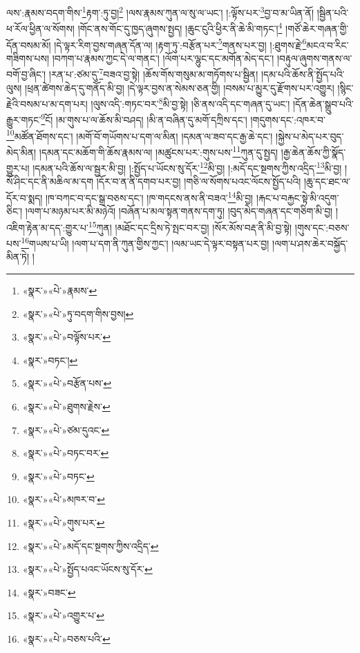 ལས་:རྣམས་བདག་གིས་\footnote{«སྣར་»«པེ་»རྣམས་}རྟག་:ཏུ་བྱ།\footnote{«སྣར་»«པེ་»ཏུ་བདག་གིས་བྱས།} །ལས་རྣམས་ཀུན་ལ་སུ་ལ་ཡང་། །:ལྟོས་པར་\footnote{«སྣར་»«པེ་»བལྟོས་པར་}བྱ་བ་མ་ཡིན་ནོ། །སྦྱིན་པའི་ཕ་རོལ་ཕྱིན་ལ་སོགས། །གོང་ནས་གོང་དུ་ཁྱད་ཞུགས་སྤྱད། །ཆུང་ངུའི་ཕྱིར་ནི་ཆེ་མི་གཏང་།\footnote{«སྣར་»བཏང་།} །གཙོ་ཆེར་གཞན་གྱི་དོན་བསམ་མོ། །དེ་ལྟར་རིག་བྱས་གཞན་དོན་ལ། །རྟག་ཏུ་:བརྩོན་པར་\footnote{«སྣར་»«པེ་»བརྩོན་པས་}གནས་པར་བྱ། །:ཐུགས་རྗེ་\footnote{«སྣར་»«པེ་»ཐུགས་རྗེས་}མངའ་བ་རིང་གཟིགས་པས། །བཀག་པ་རྣམས་ཀྱང་དེ་ལ་གནང་། །ལོག་པར་ལྷུང་དང་མགོན་མེད་དང་། །བརྟུལ་ཞུགས་གནས་ལ་བགོ་བྱ་ཞིང་། །རན་པ་:ཙམ་དུ་\footnote{«སྣར་»«པེ་»ཙམ་དུའང་}བཟའ་བྱ་སྟེ། །ཆོས་གོས་གསུམ་མ་གཏོགས་པ་སྦྱིན། །དམ་པའི་ཆོས་ནི་སྤྱོད་པའི་ལུས། །ཕྲན་ཚེགས་ཆེད་དུ་གནོད་མི་བྱ། །དེ་ལྟར་བྱས་ན་སེམས་ཅན་གྱི། །བསམ་པ་མྱུར་དུ་རྫོགས་པར་འགྱུར། །སྙིང་རྗེའི་བསམ་པ་མ་དག་པར། །ལུས་འདི་:གཏང་བར་\footnote{«སྣར་»«པེ་»བཏང་བར་}མི་བྱ་སྟེ། །ཅི་ནས་འདི་དང་གཞན་དུ་ཡང་། །དོན་ཆེན་སྒྲུབ་པའི་རྒྱུར་གཏང་\footnote{«སྣར་»«པེ་»བཏང་}ངོ། །མ་གུས་པ་ལ་ཆོས་མི་བཤད། །མི་ན་བཞིན་དུ་མགོ་དཀྲིས་དང་། །གདུགས་དང་:འཁར་བ་\footnote{«སྣར་»«པེ་»མཁར་བ་}མཚོན་ཐོགས་དང་། །མགོ་བོ་གཡོགས་པ་དག་ལ་མིན། །དམན་ལ་ཟབ་དང་རྒྱ་ཆེ་དང་། །སྐྱེས་པ་མེད་པར་བུད་མེད་མིན། །དམན་དང་མཆོག་གི་ཆོས་རྣམས་ལ། །མཚུངས་པར་:གུས་པས་\footnote{«སྣར་»«པེ་»གུས་པར་}ཀུན་དུ་སྤྱད། །རྒྱ་ཆེན་ཆོས་ཀྱི་སྣོད་གྱུར་པ། །དམན་པའི་ཆོས་ལ་སྦྱར་མི་བྱ། །:སྤྱོད་པ་ཡོངས་སུ་དོར་\footnote{«སྣར་»«པེ་»མདོ་དང་སྔགས་ཀྱིས་འདྲིད་}མི་བྱ། །:མདོ་དང་སྔགས་ཀྱིས་འདྲིད་\footnote{«སྣར་»«པེ་»སྤྱོད་པའང་ཡོངས་སུ་དོར་}མི་བྱ། །སོ་ཤིང་དང་ནི་མཆིལ་མ་དག །དོར་བ་ན་ནི་དགབ་པར་བྱ། །གཅི་ལ་སོགས་པའང་ལོངས་སྤྱོད་པའི། །ཆུ་དང་ཐང་ལ་དོར་བ་སྨད། །ཁ་བཀང་བ་དང་སྒྲ་བཅས་དང་། །ཁ་གདངས་ནས་ནི་བཟའ་\footnote{«སྣར་»བཟང་}མི་བྱ། །རྐང་པ་བརྐྱང་སྟེ་མི་འདུག་ཅིང་། །ལག་པ་མཉམ་པར་མི་མཉེའོ། །བཞོན་པ་མལ་སྟན་གནས་དག་ཏུ། །བུད་མེད་གཞན་དང་གཅིག་མི་བྱ། །འཇིག་རྟེན་མ་དད་:གྱུར་པ་\footnote{«སྣར་»«པེ་»འགྱུར་པ་}ཀུན། །མཐོང་དང་དྲིས་ཏེ་སྤང་བར་བྱ། །སོར་མོས་བརྡ་ནི་མི་བྱ་སྟེ། །གུས་དང་:བཅས་པས་\footnote{«སྣར་»«པེ་»བཅས་པའི་}གཡས་པ་ཡི། །ལག་པ་དག་ནི་ཀུན་གྱིས་ཀྱང་། །ལམ་ཡང་དེ་ལྟར་བསྟན་པར་བྱ། །ལག་པ་ཤས་ཆེར་བསྐྱོད་མིན་ཏེ། །

